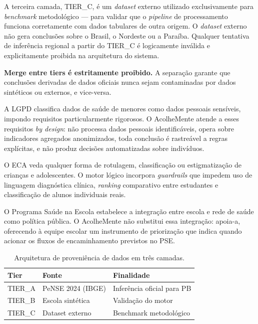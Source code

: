 \documentclass[
    12pt,
    openright,
    oneside,
    a4paper,
    english,
    brazil
]{abntex2}
\begin{document}
A terceira camada, TIER\_C, é um \textit{dataset} externo utilizado exclusivamente para \textit{benchmark} metodológico --- para validar que o \textit{pipeline} de processamento funciona corretamente com dados tabulares de outra origem. O \textit{dataset} externo não gera conclusões sobre o Brasil, o Nordeste ou a Paraíba. Qualquer tentativa de inferência regional a partir do TIER\_C é logicamente inválida e explicitamente proibida na arquitetura do sistema.

\textbf{Merge entre tiers é estritamente proibido.} A separação garante que conclusões derivadas de dados oficiais nunca sejam contaminadas por dados sintéticos ou externos, e vice-versa.

A LGPD \cite{brasil_lgpd_2018} classifica dados de saúde de menores como dados pessoais sensíveis, impondo requisitos particularmente rigorosos. O AcolheMente atende a esses requisitos \textit{by design}: não processa dados pessoais identificáveis, opera sobre indicadores agregados anonimizados, toda conclusão é rastreável a regras explícitas, e não produz decisões automatizadas sobre indivíduos.

O ECA \cite{brasil_eca_1990} veda qualquer forma de rotulagem, classificação ou estigmatização de crianças e adolescentes. O motor lógico incorpora \textit{guardrails} que impedem uso de linguagem diagnóstica clínica, \textit{ranking} comparativo entre estudantes e classificação de alunos individuais reais.

O Programa Saúde na Escola \cite{brasil_pse_2007} estabelece a integração entre escola e rede de saúde como política pública. O AcolheMente não substitui essa integração: apoia-a, oferecendo à equipe escolar um instrumento de priorização que indica quando acionar os fluxos de encaminhamento previstos no PSE.

\begin{table}[H]
\centering
\caption{Arquitetura de proveniência de dados em três camadas.}
\label{tab:tiers}
\begin{tabular}{lll}
\toprule
\textbf{Tier} & \textbf{Fonte} & \textbf{Finalidade} \\
\midrule
TIER\_A & PeNSE 2024 (IBGE)    & Inferência oficial para PB \\
TIER\_B & Escola sintética      & Validação do motor \\
TIER\_C & Dataset externo       & Benchmark metodológico \\
\bottomrule
\end{tabular}
\end{table}
\end{document}
